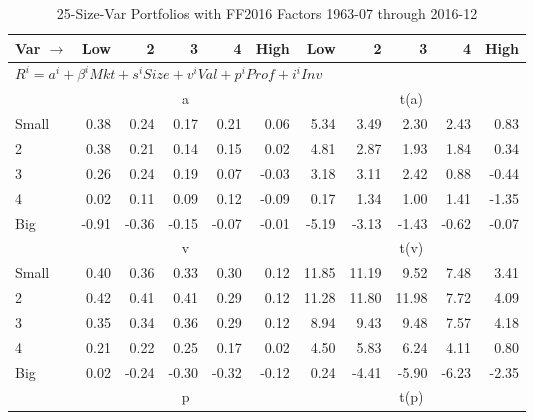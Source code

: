 
\begin{table}[!ht]
\centering
\caption{25-Size-Var Portfolios with FF2016 Factors 1963-07 through 2016-12}
\begin{tabular}{lrrrrrrrrrr}
  \toprule
    Var $\rightarrow$ & Low & 2 & 3 & 4 & High & Low & 2 & 3 & 4 & High \\ 
  \midrule
  \multicolumn{11}{l}{$R^i=a^i+\beta^iMkt+s^iSize+v^iVal+p^iProf+i^iInv$} \\

  
    
      & \multicolumn{5}{c}{a} & \multicolumn{5}{c}{t(a)}
    
    \\
      \cmidrule(r){2-6} \cmidrule(r){7-11}

    Small   & 0.38  & 0.24  & 0.17  & 0.21  & 0.06  & 5.34  & 3.49  & 2.30  & 2.43  & 0.83  \\
         2  & 0.38  & 0.21  & 0.14  & 0.15  & 0.02  & 4.81  & 2.87  & 1.93  & 1.84  & 0.34  \\
         3  & 0.26  & 0.24  & 0.19  & 0.07  & -0.03  & 3.18  & 3.11  & 2.42  & 0.88  & -0.44  \\
         4  & 0.02  & 0.11  & 0.09  & 0.12  & -0.09  & 0.17  & 1.34  & 1.00  & 1.41  & -1.35  \\
    Big     & -0.91  & -0.36  & -0.15  & -0.07  & -0.01  & -5.19  & -3.13  & -1.43  & -0.62  & -0.07  \\

  
    
      & \multicolumn{5}{c}{v} & \multicolumn{5}{c}{t(v)}
    
    \\
      \cmidrule(r){2-6} \cmidrule(r){7-11}

    Small   & 0.40  & 0.36  & 0.33  & 0.30  & 0.12  & 11.85  & 11.19  & 9.52  & 7.48  & 3.41  \\
         2  & 0.42  & 0.41  & 0.41  & 0.29  & 0.12  & 11.28  & 11.80  & 11.98  & 7.72  & 4.09  \\
         3  & 0.35  & 0.34  & 0.36  & 0.29  & 0.12  & 8.94  & 9.43  & 9.48  & 7.57  & 4.18  \\
         4  & 0.21  & 0.22  & 0.25  & 0.17  & 0.02  & 4.50  & 5.83  & 6.24  & 4.11  & 0.80  \\
    Big     & 0.02  & -0.24  & -0.30  & -0.32  & -0.12  & 0.24  & -4.41  & -5.90  & -6.23  & -2.35  \\

  
    
      & \multicolumn{5}{c}{p} & \multicolumn{5}{c}{t(p)}
    

\end{tabular}
\end{table}
